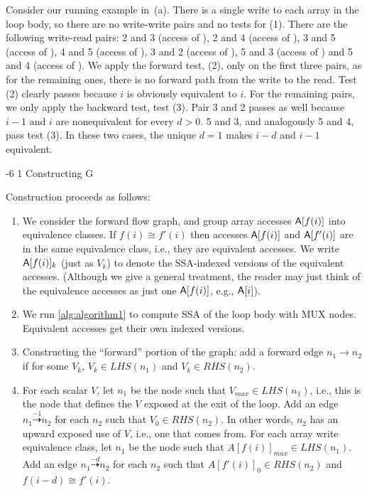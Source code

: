 \documentclass[sigconf, screen, natbib=false, dvipsnames, table]{acmart}
\makeatletter
\renewcommand{\subsubsection}{\@startsection{subsubsection}{3}{\z@}%
                        {-6\p@ \@plus -4\p@ \@minus -4\p@}%
                        {1\p@ \@plus 1\p@ \@minus 0\p@}%
                        {\normalfont\normalsize\bfseries\boldmath}}
\theoremstyle{definition}
\makeatother
\begin{document}
Consider our running example in~(a). There is a single write to each array in the loop body, 
so there are no write-write pairs and no tests for (1). There are the following write-read pairs: 2 and 3 (access of \A), 
2 and 4 (access of \A), 3 and 5 (access of \B), 4 and 5 (access of \C), 3 and 2 (access of \B), 5 and 3 (access of \D) and 5 and 4 (access of \D).
We apply the forward test, (2), only on the first three pairs, as for the remaining ones, there is no forward path from the write to the read. 
Test (2) clearly passes because $i$ is obviously equivalent to $i$. For the remaining pairs, we only apply the backward test, test (3). 
Pair 3 and 2 passes as well because $i-1$ and $i$ are nonequivalent for every $d > 0$. 5 and 3, and analogously 5 and 4, pass test (3). 
In these two cases, the unique $d = 1$ makes $i - d$ and $i-1$ equivalent. 



\subsubsection{Constructing G}

Construction proceeds as follows: 

\begin{enumerate}

\item We consider the forward flow graph, and group array accesses ${\sf A}[f(i)]$ into equivalence classes. If $f(i) \cong f'(i)$
then accesses ${\sf A}[f(i)]$ and ${\sf A}[f'(i)]$ are in the same equivalence class, i.e., they are equivalent accesses. We write ${\sf A}[f(i)]_k$ 
(just as $V_k$) to denote the SSA-indexed versions of the equivalent accesses. (Although we give a general treatment, the reader 
may just think of the equivalence accesses as just one ${\sf A}[f(i)]$, e.g., ${\sf A}[i]$). 

\item We run \ref{alg:algorithm1} to compute SSA of the loop body with MUX nodes. Equivalent accesses get their own indexed versions.

\item Constructing the ``forward'' portion of the graph: add a forward edge $n_1 \rightarrow n_2$ if for some $V_k$, 
$V_k \in LHS(n_1)$ and $V_k \in RHS(n_2)$.  

\item For each scalar $V$, let $n_1$ be the node such that $V_\mathit{max} \in LHS(n_1)$, 
i.e., this is the node that defines the $V$ exposed at the exit of the loop. Add an edge $n_1 \stackrel{-1}{\dasharrow} n_2$ 
for each $n_2$ such that $V_0 \in RHS(n_2)$. In other words, $n_2$ has an upward exposed use of $V$, i.e., one that comes
from. For each array write equivalence class, let $n_1$ be the node such that $A[f(i)]_\mathit{max} \in LHS(n_1)$. Add an edge 
$n_1 \stackrel{-d}{\dasharrow} n_2$ for each $n_2$ such that $A[f'(i)]_0 \in RHS(n_2)$ and $f(i-d) \cong f'(i)$.

\end{enumerate}
\end{document}

